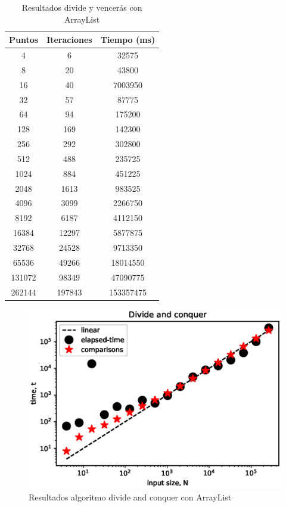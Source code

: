 \begin{table}[h!]
    \centering
    \begin{tabular}{|c|c|c|}
    \hline
    Puntos & Iteraciones & Tiempo (ms)\\
    \hline
    4 & 6 & 32575\\
    \hline
    8 & 20 & 43800\\
    \hline
    16 & 40 & 7003950\\
    \hline
    32 & 57 & 87775\\
    \hline
    64 & 94 & 175200\\
    \hline
    128 & 169 & 142300\\
    \hline
    256 & 292 & 302800\\
    \hline
    512 & 488 & 235725\\
    \hline
    1024 & 884 & 451225\\
    \hline
    2048 & 1613 & 983525\\
    \hline
    4096 & 3099 & 2266750\\
    \hline
    8192 & 6187 & 4112150\\
    \hline
    16384 & 12297 & 5877875\\
    \hline
    32768 & 24528 & 9713350\\
    \hline
    65536 & 49266 & 18014550\\
    \hline
    131072 & 98349 & 47090775\\
    \hline
    262144 & 197843 & 153357475\\
    \hline
    \end{tabular}
    \caption{Resultados divide y vencerás con ArrayList}
    \label{tab:divideAT}
\end{table}
\begin{figure}[h!]
    \centering
    \includegraphics[scale=0.8, center]{images/divideArrayList.eps}
    \caption{Resultados algoritmo divide and conquer con ArrayList}
    \label{fig:divideAG}
\end{figure}
